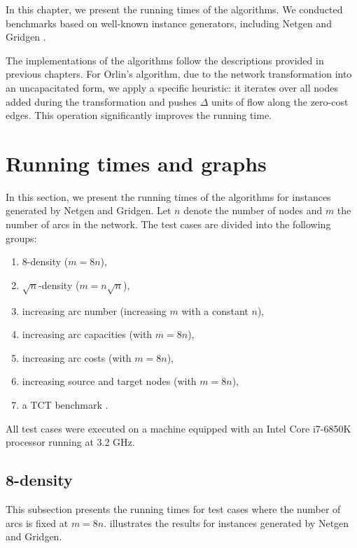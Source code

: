 
In this chapter, we present the running times of the algorithms. We conducted benchmarks based on well-known instance generators, including Netgen \cite{netgen} and Gridgen \cite{gridgen}.

The implementations of the algorithms follow the descriptions provided in previous chapters. For Orlin's algorithm, due to the network transformation into an uncapacitated form, we apply a specific heuristic: it iterates over all nodes added during the transformation and pushes $\Delta$ units of flow along the zero-cost edges. This operation significantly improves the running time.

\section{Running times and graphs}

In this section, we present the running times of the algorithms for instances generated by Netgen and Gridgen. Let $n$ denote the number of nodes and $m$ the number of arcs in the network. The test cases are divided into the following groups:

\begin{enumerate}
    \item 8-density ($m = 8n$),
    \item $\sqrt{n}$-density ($m = n\sqrt{n}$),
    \item increasing arc number (increasing $m$ with a constant $n$),
    \item increasing arc capacities (with $m = 8n$), 
    \item increasing arc costs (with $m = 8n$), 
    \item increasing source and target nodes (with $m = 8n$),
    \item a TCT benchmark \cite{bonnmcf}.
\end{enumerate}

All test cases were executed on a machine equipped with an Intel Core i7-6850K processor running at 3.2 GHz.

\subsection{8-density}
This subsection presents the running times for test cases where the number of arcs is fixed at $m = 8n$.  illustrates the results for instances generated by Netgen and Gridgen.


